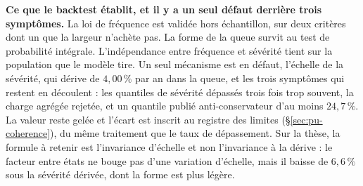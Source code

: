 \begin{cle}
\textbf{Ce que le backtest établit, et il y a un seul défaut derrière trois symptômes.} La loi de
fréquence est validée hors échantillon, sur deux critères dont un que la largeur n'achète pas. La
forme de la queue survit au test de probabilité intégrale. L'indépendance entre fréquence et
sévérité tient sur la population que le modèle tire. Un seul mécanisme est en défaut,
l'échelle de la sévérité, qui dérive de $4{,}00\,\%$ par an dans la queue, et les trois symptômes
qui restent en découlent : les quantiles de sévérité dépassés trois fois trop souvent, la charge
agrégée rejetée, et un quantile publié anti-conservateur d'au moins $24{,}7\,\%$. La valeur reste
gelée et l'écart est inscrit au registre des limites (\S\ref{sec:pu-coherence}), du même
traitement que le taux de dépassement. Sur la thèse, la formule à retenir est
l'invariance d'échelle et non l'invariance à la dérive : le facteur entre états ne bouge pas
d'une variation d'échelle, mais il baisse de $6{,}6\,\%$ sous la sévérité dérivée, dont la forme
est plus légère.
\end{cle}


